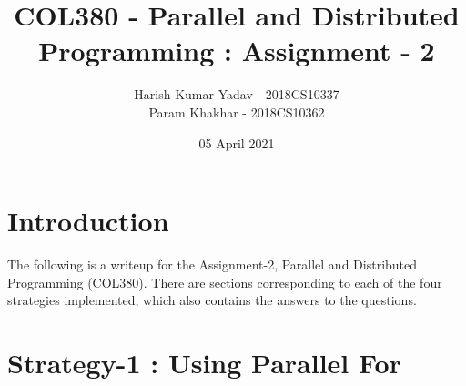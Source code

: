 \documentclass[12pt]{article}
\title{COL380 - Parallel and Distributed Programming : Assignment - 2}
\author{Harish Kumar Yadav - 2018CS10337 \\ Param Khakhar - 2018CS10362}
\date{05 April 2021}
\begin{document}
\maketitle

\section *{Introduction}

The following is a writeup for the Assignment-2, Parallel and Distributed Programming (COL380). There are sections corresponding to each of the four strategies implemented, which also contains the answers to the questions.

\section*{Strategy-1 : Using Parallel For}







\end{document}
